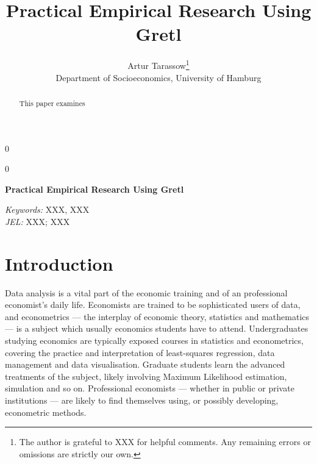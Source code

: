 \documentclass[11pt]{article}
\newcommand{\blind}{0}
\begin{document}
%

\def\spacingset#1{\renewcommand{\baselinestretch}%
	{#1}\small\normalsize} \spacingset{1}



\blind
{
	\title{\bf Practical Empirical Research Using Gretl}
	\author{Artur Tarassow\thanks{
			The author is grateful to XXX for helpful comments. Any remaining errors or omissions are strictly our own.}\hspace{.2cm}\\
		Department of Socioeconomics, University of Hamburg}
	\maketitle
} \fi

\blind
{
	\bigskip
	\bigskip
	\bigskip
	\begin{center}
		{\LARGE\bf Practical Empirical Research Using Gretl}
	\end{center}
	\medskip
} \fi

\bigskip
\begin{abstract}
	This paper examines 
\end{abstract}

\noindent%
{\it Keywords:} XXX, XXX\\
{\it JEL:} XXX; XXX

\vfill

\newpage
\doublespacing

\newpage
\section{Introduction}
\label{sec:intro}
Data analysis is a vital part of the economic training and of an professional economist's daily life. Economists are trained to be sophisticated users of data, and econometrics --- the interplay of economic theory, statistics and mathematics --- is a subject which usually economics students have to attend. %
Undergraduates studying economics are typically exposed courses in statistics and econometrics, covering the practice and interpretation of least-squares regression, data management and data visualisation. Graduate students learn the advanced treatments of the subject, likely involving Maximum Likelihood estimation, simulation and so on. Professional economists --- whether in public or private institutions --- are likely to find themselves using, or possibly developing, econometric methods.
\end{document}

